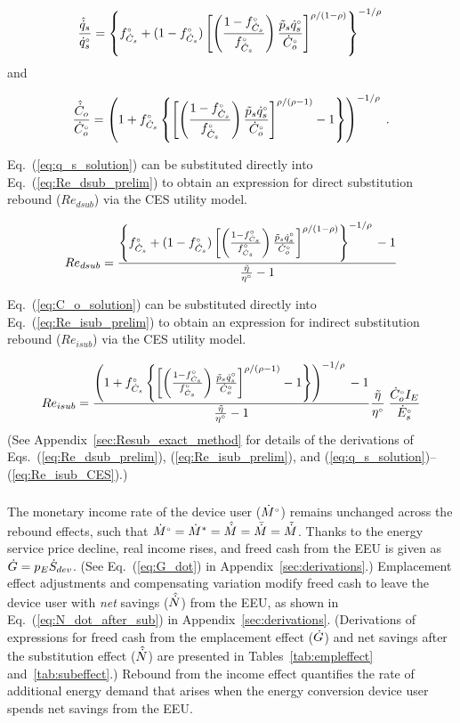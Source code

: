 \documentclass[12pt]{article}\usepackage[]{graphicx}\usepackage[]{xcolor}
\begin{document}
\begin{equation} \label{eq:q_s_solution}
  \frac{\rasub{q}_s}{\rbempl{q}_s} = \qssolution{}
\end{equation}
%
and

\begin{equation} \label{eq:C_o_solution}
  \frac{\rasub{C}_o}{\rbempl{C}_o} = \Cosolution{} \; .
\end{equation}

Eq.~(\ref{eq:q_s_solution}) can be substituted directly
into Eq.~(\ref{eq:Re_dsub_prelim})
to obtain an expression for direct substitution rebound ($Re_{dsub}$)
via the CES utility model.

\begin{equation} \label{eq:Re_dsub_CES}
  Re_{dsub} = \RedsubCES{}
\end{equation}

Eq.~(\ref{eq:C_o_solution}) can be substituted directly
into Eq.~(\ref{eq:Re_isub_prelim})
to obtain an expression for indirect substitution rebound ($Re_{isub}$)
via the CES utility model.

\begin{equation} \label{eq:Re_isub_CES}
  Re_{isub} = \ReisubCES{}
\end{equation}
%
(See Appendix~\ref{sec:Resub_exact_method} for details
of the derivations of Eqs.~(\ref{eq:Re_dsub_prelim}), 
(\ref{eq:Re_isub_prelim}), and 
(\ref{eq:q_s_solution})--(\ref{eq:Re_isub_CES}).)


\subsubsection{\Inceffect}
\label{sec:inc_effect_main_paper}

The monetary income rate of the device user ($\rbempl{M}$)
remains unchanged across the rebound effects, 
such that
$\rbempl{M} = \raempl{M} = \rasub{M} = \rainc{M} = \ramacro{M}$.
Thanks to the energy service price decline, real income rises, 
and freed cash from the EEU is given 
as $\rate{G} = p_E \Sdot$.
(See Eq.~(\ref{eq:G_dot}) in Appendix~\ref{sec:derivations}.)
Emplacement effect adjustments and compensating variation
modify freed cash to leave the device user with
\emph{net} savings ($\rasub{N}$) from the EEU,
as shown in Eq.~(\ref{eq:N_dot_after_sub}) in Appendix~\ref{sec:derivations}.
(Derivations of expressions for freed cash from the 
emplacement effect ($\rate{G}$)
and net savings after the substitution effect ($\rasub{N}$)
are presented in Tables~\ref{tab:empleffect} and~\ref{tab:subeffect}.)
Rebound from the income effect quantifies the rate of additional energy demand 
that arises when the energy conversion device user spends net
savings from the EEU.
\end{document}
